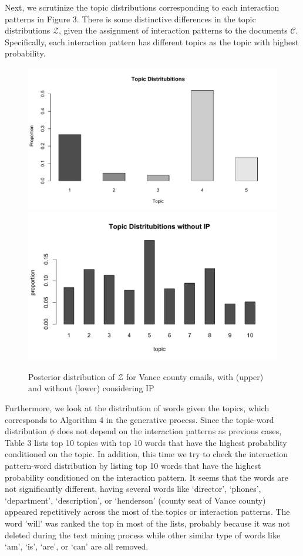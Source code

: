 \documentclass[a4paper]{article}
\begin{document}
Next, we scrutinize the topic distributions corresponding to each interaction patterns in Figure 3. There is some distinctive differences in the topic distributions $\mathcal{Z}$, given the assignment of interaction patterns to the documents $\mathcal{C}$. Specifically, each interaction pattern has different topics as the topic with highest probability.
\begin{figure}[ht]
	\centering
	\includegraphics[width=1\textwidth]{topicplot.pdf} 
		\includegraphics[width=1\textwidth]{topicplot2.pdf} 
	\caption{Posterior distribution of  $\mathcal{Z}$ for Vance county emails, with (upper) and without (lower) considering IP}
	\label{fig:Vancebarplot}
\end{figure}
\normalsize
\newline
Furthermore, we look at the distribution of words given the topics, which corresponds to Algorithm 4 in the generative process. Since the topic-word distribution $\phi$ does not depend on the interaction patterns as previous cases, Table 3 lists top 10 topics with top 10 words that have the highest probability conditioned on the topic. In addition, this time we try to check the interaction pattern-word distribution by listing top 10 words that have the highest probability conditioned on the interaction pattern. It seems that the words are not significantly different, having several words like `director', `phones', `department', `description', or `henderson' (county seat of Vance county) appeared repetitively across the most of the topics or interaction patterns. The word 'will' was ranked the top in most of the lists, probably because it was not deleted during the text mining process while other similar type of words like `am', `is', `are', or `can' are all removed. \\
\end{document}
